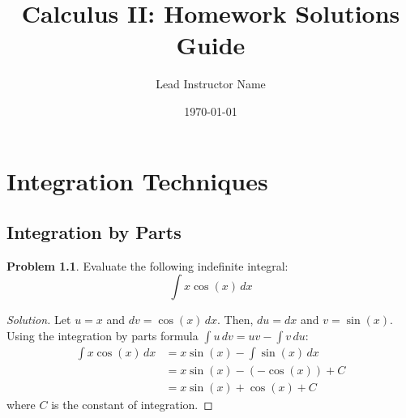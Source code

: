 \documentclass[11pt,a4paper]{report}
\title{\bfseries Calculus II: Homework Solutions Guide}
\author{Lead Instructor Name}
\date{\today}
\theoremstyle{definition}
\newtheorem{problem}{Problem}[section]
\newenvironment{solution}{\begin{proof}[Solution]}{\end{proof}}
\begin{document}
\maketitle

\chapter{Integration Techniques}

\section{Integration by Parts}

\begin{problem}
Evaluate the following indefinite integral:
\begin{equation*}
    \int x \cos(x) \, dx
\end{equation*}
\end{problem}

\begin{solution}
Let $u = x$ and $dv = \cos(x) \, dx$. Then, $du = dx$ and $v = \sin(x)$.
Using the integration by parts formula $\int u \, dv = u v - \int v \, du$:
\begin{align*}
    \int x \cos(x) \, dx &= x \sin(x) - \int \sin(x) \, dx \\
    &= x \sin(x) - (-\cos(x)) + C \\
    &= x \sin(x) + \cos(x) + C
\end{align*}
where $C$ is the constant of integration.
\end{solution}
\end{document}
